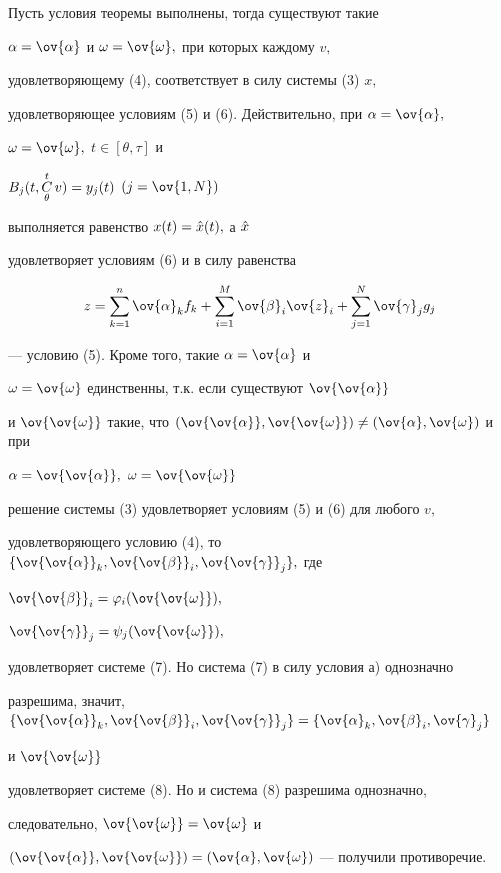 \begin{pf} Пусть условия теоремы выполнены, тогда существуют такие


$\alpha=\ov{\alpha}$ и $\omega=\ov{\omega},$ при которых каждому $v,$


удовлетворяющему (4), соответствует в силу системы (3) $x,$


удовлетворяющее условиям (5) и (6). Действительно, при $\alpha=\ov{\alpha},$


$\omega=\ov{\omega},$ $t\in[\theta,\tau]$ и


$B_j(t,\underset{\theta}{\overset{t}{C}}{}\, v) = y_j(t)$ $(j=\ov{1,N})$


выполняется равенство $x(t)=\Hat{x}(t),$ а $\Hat{x}$


удовлетворяет условиям (6) и в силу равенства


$$


z=\sum_{k=1}^n\ov{\alpha}_k f_k +


\sum_{i=1}^M\ov{\beta}_i \ov{z}_i +


\sum_{j=1}^N\ov{\gamma}_j g_j


$$


--- условию (5). Кроме того, такие $\alpha=\ov{\alpha}$ и


$\omega=\ov{\omega}$ единственны, т.к. если существуют $\ov{\ov{\alpha}}$


и $\ov{\ov{\omega}}$ такие, что $(\ov{\ov{\alpha}},


\ov{\ov{\omega}})\ne(\ov{\alpha},\ov{\omega})$ и при


$\alpha = \ov{\ov{\alpha}},$ $\omega = \ov{\ov{\omega}}$


решение системы (3) удовлетворяет условиям (5) и (6) для любого $v,$


удовлетворяющего условию (4), то $\{\ov{\ov{\alpha}}_k,


\ov{\ov{\beta}}_i,\ov{\ov{\gamma}}_j\},$ где


$\ov{\ov{\beta}}_i = \varphi_i(\ov{\ov{\omega}}),$


$\ov{\ov{\gamma}}_j = \psi_j(\ov{\ov{\omega}}),$


удовлетворяет системе (7). Но система (7) в силу условия а) однозначно


разрешима, значит, $\{\ov{\ov{\alpha}}_k,


\ov{\ov{\beta}}_i,\ov{\ov{\gamma}}_j\}=


\{\ov{\alpha}_k,\ov{\beta}_i,\ov{\gamma}_j\}$


и $\ov{\ov{\omega}}$


удовлетворяет системе (8). Но и система (8) разрешима однозначно,


следовательно, $\ov{\ov{\omega}}=\ov{\omega}$ и


$(\ov{\ov{\alpha}},\ov{\ov{\omega}})=


(\ov{\alpha},\ov{\omega})$ --- получили противоречие.


\end{pf}






